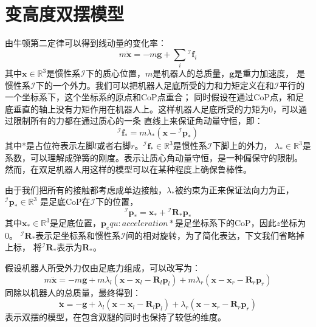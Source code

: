 \section{变高度双摆模型}
由牛顿第二定律可以得到线动量的变化率：
\begin{equation}
    \label{equ:newton_2}
    m \ddot{\boldsymbol{x}}=-m \boldsymbol{g}+\sum_i{ }^{\mathcal{I}} \boldsymbol{f}_i
\end{equation}
其中$\boldsymbol{x} \in \mathbb{R}^{3}$是惯性系$\mathcal{I}$下的质心位置，$m$是机器人的总质量，$\boldsymbol{g}$是重力加速度， 
是惯性系$\mathcal{I}$下的一个外力。我们可以把机器人足底所受的力和力矩定义在和$\mathcal{I}$平行的一个坐标系下，这个坐标系的原点和CoP点重合；
同时假设在通过CoP点，和足底垂直的轴上没有力矩作用在机器人上。这样机器人足底所受的力矩为0，可以通过限制所有的力都在通过质心的一条
直线上来保证角动量守恒，即：
\begin{equation}
    \label{equ:linear_f}
    { }^{\mathcal{I}} \boldsymbol{f}_*=m \lambda_*\left(\boldsymbol{x}-{ }^{\mathcal{I}} \boldsymbol{p}_*\right)
\end{equation}
其中*是占位符表示左脚$l$或者右脚$r$。${ }^{\mathcal{I}} \boldsymbol{f}_* \in \mathbb{R}^{3}$是惯性系$\mathcal{I}$下脚上的外力，
$\lambda_* \in \mathbb{R}^{3}$是系数，可以理解成弹簧的刚度。表示让质心角动量守恒，是一种偏保守的限制。
然而，在双足机器人用这样的模型可以在某种程度上确保鲁棒性。

由于我们把所有的接触都考虑成单边接触，$\lambda_*$被约束为正来保证法向力为正，${ }^{\mathcal{I}} \boldsymbol{p}_* \in \mathbb{R}^{3}$
是足底CoP在$\mathcal{I}$下的位置，
\begin{equation}
    \label{equ:cop}
    { }^{\mathcal{I}} \boldsymbol{p}_*=\boldsymbol{x}_*+{ }^{\mathcal{I}} \boldsymbol{R}_* \boldsymbol{p}_*
\end{equation}
其中$\boldsymbol{x}_* \in \mathbb{R}^{3}$是足底位置，$\boldsymbol{p}_equ:acceleration*$是足坐标系下的CoP，因此$z$坐标为0。
${ }^{\mathcal{I}} \boldsymbol{R}_*$表示足坐标系和惯性系$\mathcal{I}$间的相对旋转，为了简化表达，下文我们省略掉上标，
将${ }^{\mathcal{I}} \boldsymbol{R}_*$表示为$\boldsymbol{R}_*$。

假设机器人所受外力仅由足底力组成，可以改写为：
\begin{equation}
    \label{equ:newton_linear_1}
    m \ddot{\boldsymbol{x}}= -m \boldsymbol{g}+m \lambda_l\left(\boldsymbol{x}-\boldsymbol{x}_l-\boldsymbol{R}_l \boldsymbol{p}_l\right)
    +m \lambda_r\left(\boldsymbol{x}-\boldsymbol{x}_r-\boldsymbol{R}_r \boldsymbol{p}_r\right)
\end{equation}
同除以机器人的总质量，最终得到：
\begin{equation}
    \label{equ:newton_linear_2}
    \ddot{\boldsymbol{x}}= -\boldsymbol{g}+\lambda_l\left(\boldsymbol{x}-\boldsymbol{x}_l-\boldsymbol{R}_l \boldsymbol{p}_l\right) 
        +\lambda_r\left(\boldsymbol{x}-\boldsymbol{x}_r-\boldsymbol{R}_r \boldsymbol{p}_r\right)
\end{equation}
表示双摆的模型，在包含双腿的同时也保持了较低的维度。


